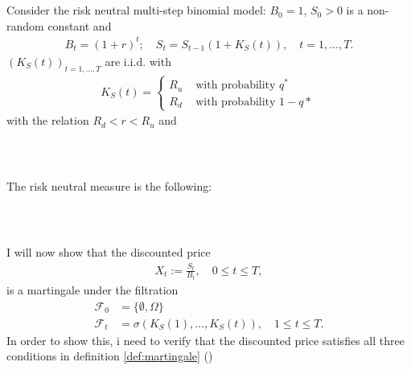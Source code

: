 \documentclass{beamer}
\numberwithin{equation}{section}
\begin{document}
\begin{frame}\frametitle{{\normalsize \secname} \\ {\large \subsecname}}
    Consider the risk neutral multi-step binomial model: $B_0 = 1$, $S_0 > 0$ is a non-random constant and
    \begin{align}
        B_t = (1 + r)^t; \quad S_t = S_{t-1}(1 + K_S(t)), \quad t = 1, \ldots, T. 
    \end{align}
    $(K_S(t))_{t = 1, \ldots, T}$ are i.i.d. with 
    \begin{align}
        K_S(t) = 
        \begin{cases}
            R_u &\text{ with probability } q^* \\
            R_d &\text{ with probability } 1-q*
        \end{cases}
    \end{align}
    with the relation $R_d < r < R_u$ and
\end{frame}

\begin{frame}\frametitle{{\normalsize \secname} \\ {\large \subsecname}}
    The risk neutral measure is the following:
    \vspace{6cm}
\end{frame}

\begin{frame}\frametitle{{\normalsize \secname} \\ {\large \subsecname}}
    I will now show that the discounted price
    \begin{align}
        X_t := \frac{S_t}{B_t}, \quad 0 \leq t \leq T, 
    \end{align}
    is a martingale under the filtration
    \begin{align}
        \mathscr{F}_0 &= \{ \emptyset, \Omega\} \label{eq:information_at_time_0} \\
        \mathscr{F}_t &= \sigma(K_S(1), \ldots, K_S(t)), \quad 1 \leq t \leq T. \label{eq:information_at_time_1}  
    \end{align}
    In order to show this, i need to verify that the discounted price satisfies all three conditions in definition \ref{def:martingale} ()
\end{frame}
\end{document}
